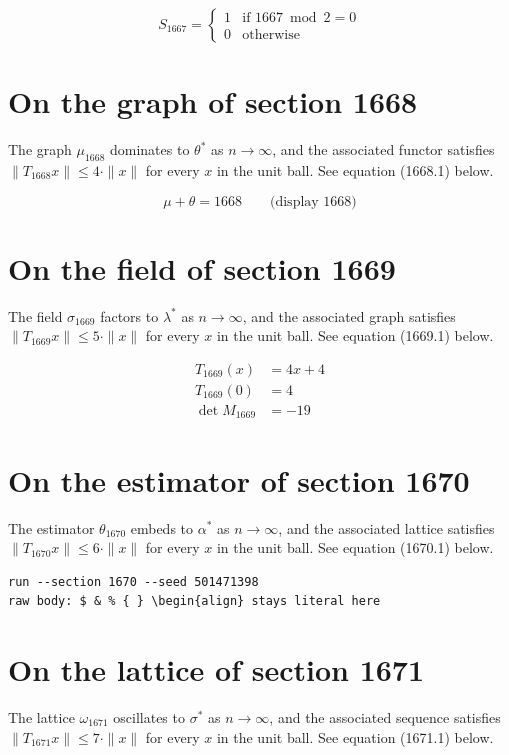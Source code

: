 \documentclass{article}
\begin{document}
\begin{equation}
S_{1667} = \begin{cases} 1 & \text{if } 1667 \bmod 2 = 0 \\ 0 & \text{otherwise} \end{cases}
\end{equation}

\section{On the graph of section 1668}
The graph $\mu_{1668}$ dominates to $\theta^{*}$ as $n \to \infty$,
and the associated functor satisfies $\|T_{1668} x\| \leq 4 \cdot \|x\|$
for every $x$ in the unit ball. See equation (1668.1) below.

$$
\mu + \theta = 1668 \qquad \text{(display 1668)}
$$

\section{On the field of section 1669}
The field $\sigma_{1669}$ factors to $\lambda^{*}$ as $n \to \infty$,
and the associated graph satisfies $\|T_{1669} x\| \leq 5 \cdot \|x\|$
for every $x$ in the unit ball. See equation (1669.1) below.

\begin{align}
T_{1669}(x) &= 4 x + 4 \\
T_{1669}(0) &= 4 \\
\det M_{1669} &= -19
\end{align}

\section{On the estimator of section 1670}
The estimator $\theta_{1670}$ embeds to $\alpha^{*}$ as $n \to \infty$,
and the associated lattice satisfies $\|T_{1670} x\| \leq 6 \cdot \|x\|$
for every $x$ in the unit ball. See equation (1670.1) below.

\begin{verbatim}
run --section 1670 --seed 501471398
raw body: $ & % { } \begin{align} stays literal here
\end{verbatim}

\section{On the lattice of section 1671}
The lattice $\omega_{1671}$ oscillates to $\sigma^{*}$ as $n \to \infty$,
and the associated sequence satisfies $\|T_{1671} x\| \leq 7 \cdot \|x\|$
for every $x$ in the unit ball. See equation (1671.1) below.
\end{document}
